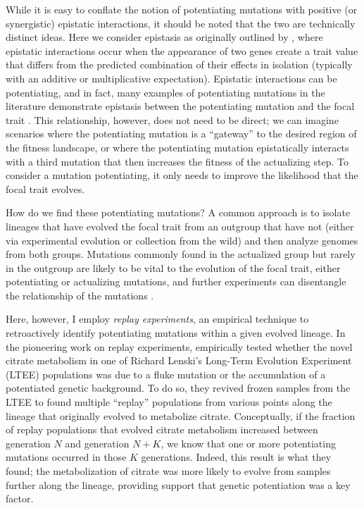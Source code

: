 While it is easy to conflate the notion of potentiating mutations with positive (or synergistic) epistatic interactions, it should be noted that the two are technically distinct ideas.
Here we consider epistasis as originally outlined by \citet{fisherCorrelationRelativesSupposition1919}, where epistatic interactions occur when the appearance of two genes create a trait value that differs from the predicted combination of their effects in isolation (typically with an additive or multiplicative expectation).
Epistatic interactions can be potentiating, and in fact, many examples of potentiating mutations in the literature demonstrate epistasis between the potentiating mutation and the focal trait \citep{douglasIdentificationPotentiatingMutations2017,giffordIdentifyingExploitingGenes2018}. 
This relationship, however, does not need to be direct; we can imagine scenarios where the potentiating mutation is a ``gateway'' to the desired region of the fitness landscape, or where the potentiating mutation epistatically interacts with a third mutation that then increases the fitness of the actualizing step. 
To consider a mutation potentiating, it only needs to improve the likelihood that the focal trait evolves. 

How do we find these potentiating mutations? 
A common approach is to isolate lineages that have evolved the focal trait from an outgroup that have not (either via experimental evolution or collection from the wild) and then analyze genomes from both groups. 
Mutations commonly found in the actualized group but rarely in the outgroup are likely to be vital to the evolution of the focal trait, either potentiating or actualizing mutations, and further experiments can disentangle the relationship of the mutations \citep{giffordIdentifyingExploitingGenes2018,cumminsRolePotentiatingMutations2021}.

Here, however, I employ \textit{replay experiments}, an empirical technique to retroactively identify potentiating mutations within a given evolved lineage. 
In the pioneering work on replay experiments, \citet{blountHistoricalContingencyEvolution2008} empirically tested whether the novel citrate metabolism in one of Richard Lenski's Long-Term Evolution Experiment (LTEE) populations \citep{lenskiLongtermExperimentalEvolution1991} was due to a fluke mutation or the accumulation of a potentiated genetic background. 
To do so, they revived frozen samples from the LTEE to found multiple ``replay'' populations from various points along the lineage that originally evolved to metabolize citrate. 
Conceptually, if the fraction of replay populations that evolved citrate metabolism increased between generation $N$ and generation $N + K$, we know that one or more potentiating mutations occurred in those $K$ generations. 
Indeed, this result is what they found; the metabolization of citrate was more likely to evolve from samples further along the lineage, providing support that genetic potentiation was a key factor. 

